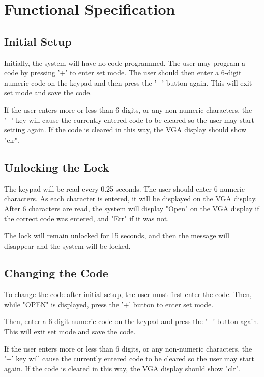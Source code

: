 \documentclass[11pt]{article}
\begin{document}
\section{Functional Specification}

\subsection{Initial Setup}

Initially, the system will have no code programmed. The user may program a code by pressing '+' to enter set mode. The user should then enter a 6-digit numeric code on the keypad and then press the '+' button again. This will exit set mode and save the code.

If the user enters more or less than 6 digits, or any non-numeric characters, the '+' key will cause the currently entered code to be cleared so the user may start setting again. If the code is cleared in this way, the VGA display should show "clr".

\subsection{Unlocking the Lock}

The keypad will be read every 0.25 seconds. The user should enter 6 numeric characters. As each character is entered,  it will be displayed on the VGA display. After 6 characters are read, the system will display "Open" on the VGA display if the correct code was entered, and "Err" if it was not.

The lock will remain unlocked for 15 seconds, and then the message will disappear and the system will be locked.

\subsection{Changing the Code}

To change the code after initial setup, the user must first enter the code. Then, while "OPEN" is displayed, press the '+' button to enter set mode.

Then, enter a 6-digit numeric code on the keypad and press the '+' button again. This will exit set mode and save the code.

If the user enters more or less than 6 digits, or any non-numeric characters, the '+' key will cause the currently entered code to be cleared so the user may start again. If the code is cleared in this way, the VGA display should show "clr".
\end{document}
